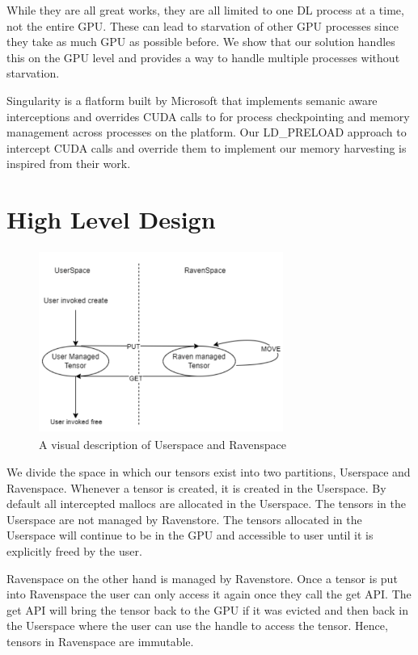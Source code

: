 \documentclass{article}
\begin{document}
While they are all great works, they are all limited to one DL process at a time, not the entire GPU. These can lead to starvation of other
GPU processes since they take as much GPU as possible before. We show that our solution handles this on the GPU level and provides a
way to handle multiple processes without starvation.

Singularity \cite{shuklasingularity} is a flatform built by Microsoft that implements semanic aware interceptions and overrides CUDA calls to for process checkpointing and
memory management across processes on the platform. Our LD\_PRELOAD approach to intercept CUDA calls and override them to implement our memory harvesting is inspired from their work. 


\section{High Level Design}
\begin{figure}[!htbp]
	\centering
	\includegraphics[height=6cm, width=8cm]{figures/ravenspace.png}
	\caption{A visual description of Userspace and Ravenspace}
\end{figure}
We divide the space in which our tensors exist into two partitions, Userspace and Ravenspace.
Whenever a tensor is created, it is created in the Userspace. By default all intercepted mallocs 
are allocated in the Userspace. The tensors in the Userspace are not managed by Ravenstore. 
The tensors allocated in the Userspace will continue to be in the GPU and accessible to user until it is explicitly freed by the user.

Ravenspace on the other hand is managed by Ravenstore. Once a tensor is put into Ravenspace the user
can only access it again once they call the get API. The get API will bring the tensor back to the GPU if it was evicted
and then back in the Userspace where the user can use the handle to access the tensor. Hence, tensors in 
Ravenspace are immutable.
\end{document}
